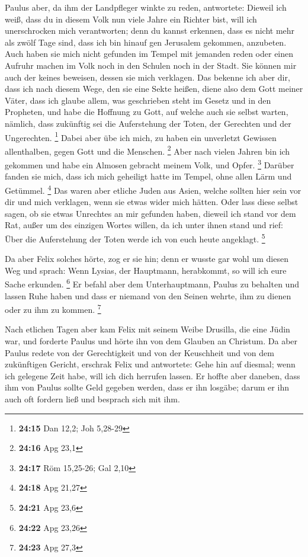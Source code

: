  Paulus aber, da ihm der Landpfleger winkte zu reden,
antwortete: Dieweil ich weiß, dass du in diesem Volk nun viele Jahre ein
Richter bist, will ich unerschrocken mich verantworten; 
denn du kannst erkennen, dass es nicht mehr als zwölf Tage sind, dass
ich bin hinauf gen Jerusalem gekommen, anzubeten.  Auch
haben sie mich nicht gefunden im Tempel mit jemanden reden oder einen
Aufruhr machen im Volk noch in den Schulen noch in der Stadt.
 Sie können mir auch der keines beweisen, dessen sie mich
verklagen.  Das bekenne ich aber dir, dass ich nach diesem
Wege, den sie eine Sekte heißen, diene also dem Gott meiner Väter, dass
ich glaube allem, was geschrieben steht im Gesetz und in den Propheten,
 und habe die Hoffnung zu Gott, auf welche auch sie selbst
warten, nämlich, dass zukünftig sei die Auferstehung der Toten, der
Gerechten und der Ungerechten. \footnote{\textbf{24:15} Dan 12,2; Joh
  5,28-29}  Dabei aber übe ich mich, zu haben ein
unverletzt Gewissen allenthalben, gegen Gott und die Menschen.
\footnote{\textbf{24:16} Apg 23,1}  Aber nach vielen Jahren
bin ich gekommen und habe ein Almosen gebracht meinem Volk, und Opfer.
\footnote{\textbf{24:17} Röm 15,25-26; Gal 2,10}  Darüber
fanden sie mich, dass ich mich geheiligt hatte im Tempel, ohne allen
Lärm und Getümmel. \footnote{\textbf{24:18} Apg 21,27}  Das
waren aber etliche Juden aus Asien, welche sollten hier sein vor dir und
mich verklagen, wenn sie etwas wider mich hätten.  Oder
lass diese selbst sagen, ob sie etwas Unrechtes an mir gefunden haben,
dieweil ich stand vor dem Rat,  außer um des einzigen
Wortes willen, da ich unter ihnen stand und rief: Über die Auferstehung
der Toten werde ich von euch heute angeklagt. \footnote{\textbf{24:21}
  Apg 23,6}

 Da aber Felix solches hörte, zog er sie hin; denn er
wusste gar wohl um diesen Weg und sprach: Wenn Lysias, der Hauptmann,
herabkommt, so will ich eure Sache erkunden. \footnote{\textbf{24:22}
  Apg 23,26}  Er befahl aber dem Unterhauptmann, Paulus zu
behalten und lassen Ruhe haben und dass er niemand von den Seinen
wehrte, ihm zu dienen oder zu ihm zu kommen. \footnote{\textbf{24:23}
  Apg 27,3}

 Nach etlichen Tagen aber kam Felix mit seinem Weibe
Drusilla, die eine Jüdin war, und forderte Paulus und hörte ihn von dem
Glauben an Christum.  Da aber Paulus redete von der
Gerechtigkeit und von der Keuschheit und von dem zukünftigen Gericht,
erschrak Felix und antwortete: Gehe hin auf diesmal; wenn ich gelegene
Zeit habe, will ich dich herrufen lassen.  Er hoffte aber
daneben, dass ihm von Paulus sollte Geld gegeben werden, dass er ihn
losgäbe; darum er ihn auch oft fordern ließ und besprach sich mit ihm.

